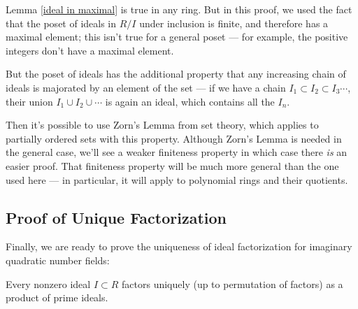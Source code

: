 \begin{note}
    Lemma \ref{ideal in maximal} is true in any ring. But in this proof, we used the fact that the poset of ideals in $R/I$ under inclusion is finite, and therefore has a maximal element; this isn't true for a general poset --- for example, the positive integers don't have a maximal element. 
    
    But the poset of ideals has the additional property that any increasing chain of ideals is majorated by an element of the set --- if we have a chain $I_1 \subset I_2 \subset I_3 \cdots$, their union $I_1 \cup I_2 \cup \cdots$ is again an ideal, which contains all the $I_n$. 
    
    Then it's possible to use Zorn's Lemma from set theory, which applies to partially ordered sets with this property. Although Zorn's Lemma is needed in the general case, we'll see a weaker finiteness property in which case there \emph{is} an easier proof. That finiteness property will be much more general than the one used here --- in particular, it will apply to polynomial rings and their quotients. 
\end{note}

\subsection{Proof of Unique Factorization}

Finally, we are ready to prove the uniqueness of ideal factorization for imaginary quadratic number fields:

\begin{theorem} \label{unique ideal factorization 2}
    Every nonzero ideal $I \subset R$ factors uniquely (up to permutation of factors) as a product of prime ideals. 
\end{theorem}

